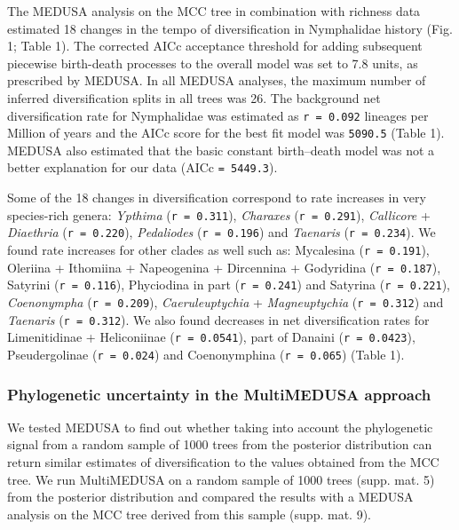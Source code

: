 \documentclass[]{article}
\begin{document}
The MEDUSA analysis on the MCC tree in combination with richness data
estimated 18 changes in the tempo of diversification in Nymphalidae
history (Fig. 1; Table 1). The corrected AICc acceptance threshold for
adding subsequent piecewise birth-death processes to the overall model
was set to 7.8 units, as prescribed by MEDUSA. In all MEDUSA analyses,
the maximum number of inferred diversification splits in all trees was
26. The background net diversification rate for Nymphalidae was
estimated as \texttt{r = 0.092} lineages per Million of years and the
AICc score for the best fit model was \texttt{5090.5} (Table 1). MEDUSA
also estimated that the basic constant birth--death model was not a
better explanation for our data (AICc \texttt{= 5449.3}).

Some of the 18 changes in diversification correspond to rate increases
in very species-rich genera: \emph{Ypthima} (\texttt{r = 0.311}),
\emph{Charaxes} (\texttt{r = 0.291}), \emph{Callicore} +
\emph{Diaethria} (\texttt{r = 0.220}), \emph{Pedaliodes}
(\texttt{r = 0.196}) and \emph{Taenaris} (\texttt{r = 0.234}). We found
rate increases for other clades as well such as: Mycalesina
(\texttt{r = 0.191}), Oleriina + Ithomiina + Napeogenina + Dircennina +
Godyridina (\texttt{r = 0.187}), Satyrini (\texttt{r = 0.116}),
Phyciodina in part (\texttt{r = 0.241}) and Satyrina
(\texttt{r = 0.221}), \emph{Coenonympha} (\texttt{r = 0.209}),
\emph{Caeruleuptychia} + \emph{Magneuptychia} (\texttt{r = 0.312}) and
\emph{Taenaris} (\texttt{r = 0.312}). We also found decreases in net
diversification rates for Limenitidinae + Heliconiinae
(\texttt{r = 0.0541}), part of Danaini (\texttt{r = 0.0423}),
Pseudergolinae (\texttt{r = 0.024}) and Coenonymphina
(\texttt{r = 0.065}) (Table 1).

\subsubsection{Phylogenetic uncertainty in the MultiMEDUSA
approach}\label{phylogenetic-uncertainty-in-the-multimedusa-approach}

We tested MEDUSA to find out whether taking into account the
phylogenetic signal from a random sample of 1000 trees from the
posterior distribution can return similar estimates of diversification
to the values obtained from the MCC tree. We run MultiMEDUSA on a random
sample of 1000 trees (supp. mat. 5) from the posterior distribution and
compared the results with a MEDUSA analysis on the MCC tree derived from
this sample (supp. mat. 9).
\end{document}
